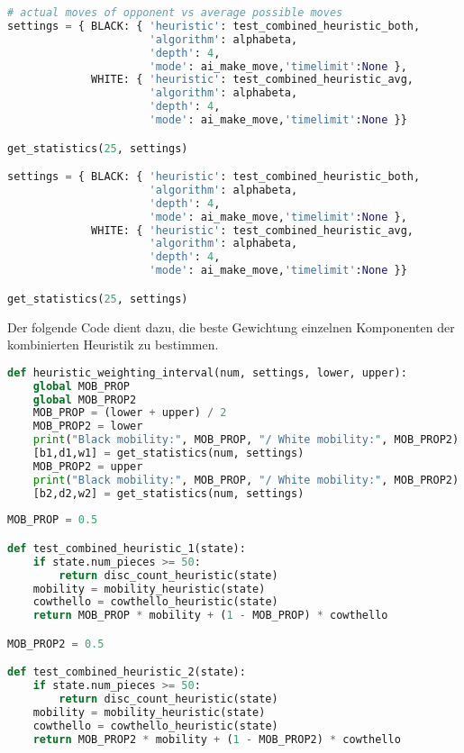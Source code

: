 \begin{lstlisting}[language=Python]
# actual moves of opponent vs average possible moves
settings = { BLACK: { 'heuristic': test_combined_heuristic_both,
                      'algorithm': alphabeta,
                      'depth': 4,
                      'mode': ai_make_move,'timelimit':None },
             WHITE: { 'heuristic': test_combined_heuristic_avg,
                      'algorithm': alphabeta,
                      'depth': 4,
                      'mode': ai_make_move,'timelimit':None }}

get_statistics(25, settings)

settings = { BLACK: { 'heuristic': test_combined_heuristic_both,
                      'algorithm': alphabeta,
                      'depth': 4,
                      'mode': ai_make_move,'timelimit':None },
             WHITE: { 'heuristic': test_combined_heuristic_avg,
                      'algorithm': alphabeta,
                      'depth': 4,
                      'mode': ai_make_move,'timelimit':None }}

get_statistics(25, settings)
\end{lstlisting}

Der folgende Code dient dazu, die beste Gewichtung einzelnen Komponenten
der kombinierten Heuristik zu bestimmen.

\begin{lstlisting}[language=Python]
def heuristic_weighting_interval(num, settings, lower, upper):
    global MOB_PROP
    global MOB_PROP2
    MOB_PROP = (lower + upper) / 2
    MOB_PROP2 = lower
    print("Black mobility:", MOB_PROP, "/ White mobility:", MOB_PROP2)
    [b1,d1,w1] = get_statistics(num, settings)
    MOB_PROP2 = upper
    print("Black mobility:", MOB_PROP, "/ White mobility:", MOB_PROP2)
    [b2,d2,w2] = get_statistics(num, settings)
    
MOB_PROP = 0.5

def test_combined_heuristic_1(state):
    if state.num_pieces >= 50:
        return disc_count_heuristic(state)
    mobility = mobility_heuristic(state)
    cowthello = cowthello_heuristic(state)
    return MOB_PROP * mobility + (1 - MOB_PROP) * cowthello

MOB_PROP2 = 0.5

def test_combined_heuristic_2(state):
    if state.num_pieces >= 50:
        return disc_count_heuristic(state)
    mobility = mobility_heuristic(state)
    cowthello = cowthello_heuristic(state)
    return MOB_PROP2 * mobility + (1 - MOB_PROP2) * cowthello
\end{lstlisting}

